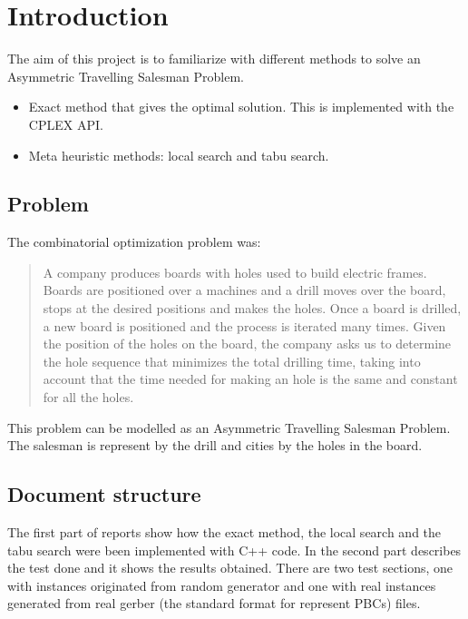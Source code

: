 \section{Introduction}
	The aim of this project is to familiarize with different methods to solve an Asymmetric Travelling Salesman Problem.
	\begin{itemize}
		\item Exact method that gives the optimal solution. This is implemented with the CPLEX API.
		\item Meta heuristic methods: local search and tabu search.
	\end{itemize}

	\subsection{Problem}
		The combinatorial optimization problem was:
		\begin{quote}
				A company produces boards with holes used to build electric frames.  Boards are positioned over a machines and a drill moves over the board, stops at the desired positions and makes the holes.  Once a board is drilled, a new board is positioned and the process is iterated many times.  Given the position of the holes on the board, the company asks us to determine the hole sequence that minimizes the total drilling time, taking into account that the time needed for making an hole is the same and constant for all the holes.
		\end{quote}
	
		This problem can be modelled as an Asymmetric Travelling Salesman Problem. The salesman is represent by the drill and cities by the holes in the board.
	
	\subsection{Document structure}
		The first part of reports show how the exact method, the local search and the tabu search were been implemented with C++ code. In the second part describes the test done and it shows the results obtained. There are two test sections, one with instances originated from random generator and one with real instances generated from real gerber (the standard format for represent PBCs) files.